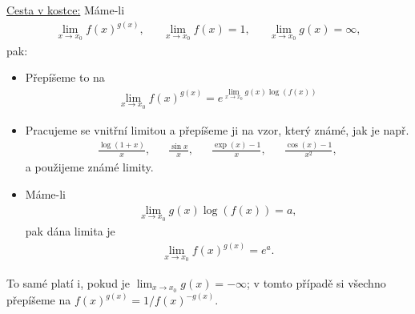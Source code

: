\documentclass[10pt,a4paper]{article}
\begin{document}
\underline{Cesta v kostce:} Máme-li
\begin{align*}
\lim_{x \to x_0} f(x)^{g(x)}, && \lim_{x \to x_0} f(x) = 1, && \lim_{x \to x_0} g(x) = \infty,
\end{align*}
pak:
\begin{itemize}
\item Přepíšeme to na 
\begin{align*}
\lim_{x \to x_0} f(x)^{g(x)} = e^{\lim_{x \to x_0} g(x) \log(f(x))}
\end{align*}
\item Pracujeme se vnitřní limitou a přepíšeme ji na vzor, který známé, jak je např.
\begin{align*}
\frac{\log(1+x)}{x}, && \frac{\sin x}{x}, && \frac{\exp(x)-1}{x}, && \frac{\cos(x)-1}{x^2},
\end{align*}
a použijeme známé limity.
\item Máme-li
\begin{align*}
\lim_{x \to x_0} g(x) \log(f(x)) = a,
\end{align*}
pak dána limita je
\begin{align*}
\lim_{x \to x_0} f(x)^{g(x)} = e^a.
\end{align*}
\end{itemize}
To samé platí i, pokud je $\lim_{x \to x_0} g(x) = - \infty$; v tomto případě si všechno přepíšeme na $f(x)^{g(x)} = 1/ f(x)^{-g(x)}$.
\end{document}
